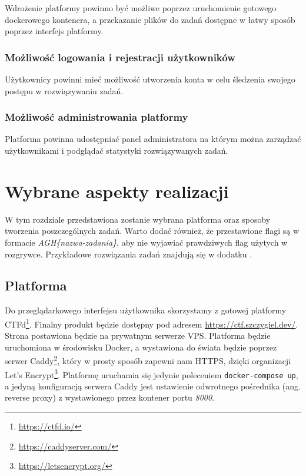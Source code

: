 \documentclass[language=polish,type=eng]{aghmodern}
\begin{document}
Wdrożenie platformy powinno być możliwe poprzez uruchomienie gotowego
dockerowego kontenera, a przekazanie plików do zadań dostępne w łatwy sposób
poprzez interfejs platformy.

\subsection{Możliwość logowania i rejestracji użytkowników}

Użytkownicy powinni mieć możliwość utworzenia konta w celu
śledzenia swojego postępu w rozwiązywaniu zadań.

\subsection{Możliwość administrowania platformy}

Platforma powinna udostępniać panel administratora na którym
można zarządzać użytkownikami i podglądać statystyki rozwiązywanych
zadań.

\chapter{Wybrane aspekty realizacji}

W tym rozdziale przedstawiona zostanie wybrana platforma oraz
sposoby tworzenia poszczególnych zadań.
Warto dodać również, że przestawione flagi są w formacie \emph{AGH\{nazwa-zadania\}},
aby nie wyjawiać prawdziwych flag użytych w rozgrywce.
Przykładowe rozwiązania zadań znajdują się w dodatku .

\section{Platforma}

Do przeglądarkowego interfejsu użytkownika skorzystamy z gotowej
platformy CTFd\footnote{\url{https://ctfd.io/}}.
Finalny produkt będzie dostępny pod adresem \url{https://ctf.szczygiel.dev/}.
Strona postawiona będzie na prywatnym serwerze VPS. Platforma będzie
uruchomiona w środowisku Docker, a wystawiona do świata będzie poprzez serwer
Caddy\footnote{\url{https://caddyserver.com/}}, który w prosty sposób zapewni nam HTTPS,
dzięki organizacji Let's Encrypt\footnote{\url{https://letsencrypt.org/}}.
Platformę uruchamia się jedynie poleceniem \texttt{docker-compose up},
a jedyną konfiguracją serwera Caddy jest ustawienie odwrotnego
pośrednika (ang. reverse proxy) z wystawionego przez kontener portu \emph{8000}.
\end{document}
